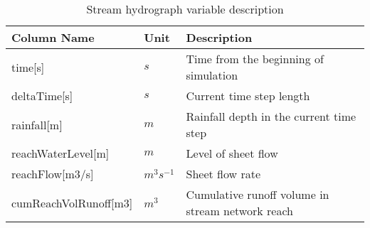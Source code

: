 
\begin{table}[t]
 \centering
    \caption{Stream hydrograph variable description}
\label{tab:vystupytokdat}
\begin{tabular}{llp{}}
  \hline  \hline
 Column Name       & Unit       & Description                                      \\
 \hline
 time[s]              &   $s$              &  Time from the beginning of simulation                   \\
 deltaTime[s]         &   $s$              &  Current time step length            \\
 rainfall[m]          &  $m$               &  Rainfall depth in the current time step \\
 reachWaterLevel[m]        &  $m$          &  Level of sheet flow            \\
 reachFlow[m3/s]              &  $m^3s^{-1}$   &  Sheet flow rate                   \\
 cumReachVolRunoff[m3]           &  $m^3$         & Cumulative runoff volume in stream network reach    \\
  \hline  \hline
 \end{tabular}
\end{table}

